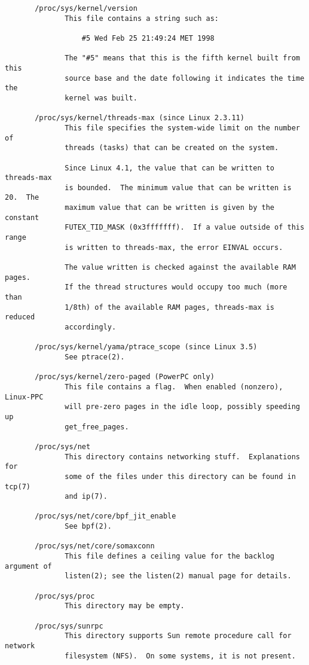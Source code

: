 \documentclass[]{article}
\begin{document}
\begin{verbatim}
       /proc/sys/kernel/version
              This file contains a string such as:

                  #5 Wed Feb 25 21:49:24 MET 1998

              The "#5" means that this is the fifth kernel built from this
              source base and the date following it indicates the time the
              kernel was built.

       /proc/sys/kernel/threads-max (since Linux 2.3.11)
              This file specifies the system-wide limit on the number of
              threads (tasks) that can be created on the system.

              Since Linux 4.1, the value that can be written to threads-max
              is bounded.  The minimum value that can be written is 20.  The
              maximum value that can be written is given by the constant
              FUTEX_TID_MASK (0x3fffffff).  If a value outside of this range
              is written to threads-max, the error EINVAL occurs.

              The value written is checked against the available RAM pages.
              If the thread structures would occupy too much (more than
              1/8th) of the available RAM pages, threads-max is reduced
              accordingly.

       /proc/sys/kernel/yama/ptrace_scope (since Linux 3.5)
              See ptrace(2).

       /proc/sys/kernel/zero-paged (PowerPC only)
              This file contains a flag.  When enabled (nonzero), Linux-PPC
              will pre-zero pages in the idle loop, possibly speeding up
              get_free_pages.

       /proc/sys/net
              This directory contains networking stuff.  Explanations for
              some of the files under this directory can be found in tcp(7)
              and ip(7).

       /proc/sys/net/core/bpf_jit_enable
              See bpf(2).

       /proc/sys/net/core/somaxconn
              This file defines a ceiling value for the backlog argument of
              listen(2); see the listen(2) manual page for details.

       /proc/sys/proc
              This directory may be empty.

       /proc/sys/sunrpc
              This directory supports Sun remote procedure call for network
              filesystem (NFS).  On some systems, it is not present.


\end{verbatim}
\end{document}
